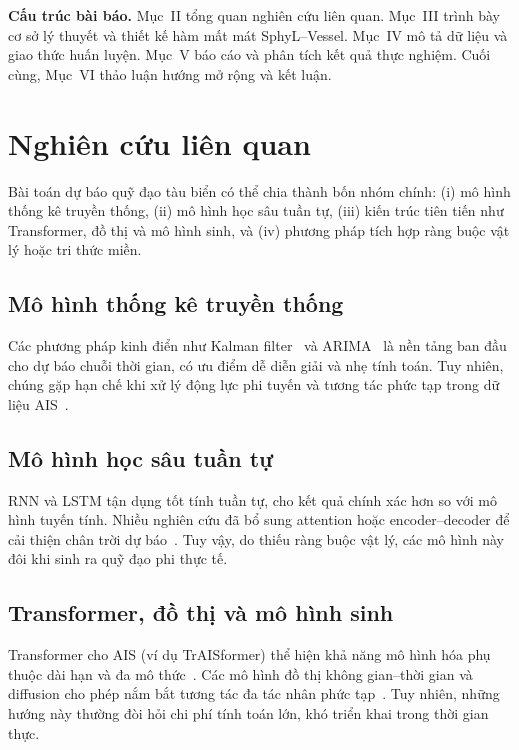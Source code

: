 \documentclass{IEEEtran}
\begin{document}
\textbf{Cấu trúc bài báo.} 
Mục~II tổng quan nghiên cứu liên quan. 
Mục~III trình bày cơ sở lý thuyết và thiết kế hàm mất mát SphyL--Vessel. 
Mục~IV mô tả dữ liệu và giao thức huấn luyện. 
Mục~V báo cáo và phân tích kết quả thực nghiệm. 
Cuối cùng, Mục~VI thảo luận hướng mở rộng và kết luận.

\section{Nghiên cứu liên quan}
Bài toán dự báo quỹ đạo tàu biển có thể chia thành bốn nhóm chính: 
(i) mô hình thống kê truyền thống, 
(ii) mô hình học sâu tuần tự, 
(iii) kiến trúc tiên tiến như Transformer, đồ thị và mô hình sinh, 
và (iv) phương pháp tích hợp ràng buộc vật lý hoặc tri thức miền.

\subsection{Mô hình thống kê truyền thống}
Các phương pháp kinh điển như Kalman filter~\cite{kalman1960} và ARIMA~\cite{box1970} là nền tảng ban đầu cho dự báo chuỗi thời gian, 
có ưu điểm dễ diễn giải và nhẹ tính toán. 
Tuy nhiên, chúng gặp hạn chế khi xử lý động lực phi tuyến và tương tác phức tạp trong dữ liệu AIS~\cite{chen2023ais,li2023ml}.

\subsection{Mô hình học sâu tuần tự}
RNN và LSTM tận dụng tốt tính tuần tự, cho kết quả chính xác hơn so với mô hình tuyến tính. 
Nhiều nghiên cứu đã bổ sung attention hoặc encoder--decoder để cải thiện chân trời dự báo~\cite{li2023deepais,zhang2022lstm,li2023engapp}. 
Tuy vậy, do thiếu ràng buộc vật lý, các mô hình này đôi khi sinh ra quỹ đạo phi thực tế.

\subsection{Transformer, đồ thị và mô hình sinh}
Transformer cho AIS (ví dụ TrAISformer) thể hiện khả năng mô hình hóa phụ thuộc dài hạn và đa mô thức~\cite{wang2024transformer,wang2024isprs}. 
Các mô hình đồ thị không gian--thời gian và diffusion cho phép nắm bắt tương tác đa tác nhân phức tạp~\cite{liu2023graphais,arxiv2023multipath}. 
Tuy nhiên, những hướng này thường đòi hỏi chi phí tính toán lớn, khó triển khai trong thời gian thực.
\end{document}
